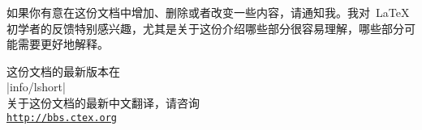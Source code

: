 \noindent 如果你有意在这份文档中增加、删除或者改变一些内容，请通知我。我对~\LaTeX{}~
初学者的反馈特别感兴趣，尤其是关于这份介绍哪些部分很容易理解，哪些部分可能需要更好地解释。%
%

\bigskip
\begin{verse}
%
\end{verse}


\noindent 这份文档的最新版本在\\
\CTAN|info/lshort|\\%

\smallskip
\noindent 关于这份文档的最新中文翻译，请咨询\\
\href{http://bbs.ctex.org}{\texttt{http://bbs.ctex.org}}\\

\endinput



%

